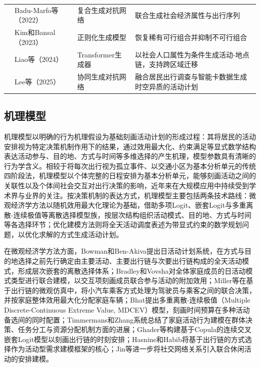 {\begin{longtable}{@{}L{1.9cm}L{3.3cm}L{2.8cm}L{5.4cm}@{}}
 & Badu-Marfo等（2022）\citep{badu-marfoCompositeTravelGenerative2022} & 复合生成对抗网络 & 联合生成社会经济属性与出行序列 \\*
 & Kim和Bansal（2023）\citep{kimDeepGenerativeModel2023} & 正则化生成模型 & 恢复稀有可行组合并抑制不可行组合 \\*
 & Liao等（2024）\citep{liaoDeepActivityModel2024} & Transformer生成器 & 以社会人口属性为条件生成活动-地点链，支持跨区域迁移 \\*
 & Lee等（2025）\citep{leeCollaborativeGenerativeAdversarial2025} & 协同生成对抗网络 & 融合居民出行调查与智能卡数据生成时空异质的活动计划 \\
\end{longtable}
}

\subsection{机理模型}\label{subsec.review.actgen.abm}

机理模型以明确的行为机理假设为基础刻画活动计划的形成过程：其将居民的活动安排视为特定决策机制作用下的结果，通过效用最大化、约束满足等显式数学结构表达活动参与、目的地、方式与时间等多维选择的产生机理，模型参数具有清晰的行为学含义\citep{rasouliActivitybasedModelsTravel2014,castiglioneActivitybasedTravelDemand2015}。相较于将每次出行视为孤立事件、以交通小区为基本分析单元的传统四阶段法，机理模型以个体完整的日程安排为基本分析单元，能够刻画活动之间的关联性以及个体间社会交互对出行决策的影响\citep{castiglioneActivitybasedTravelDemand2015,ericmillerCurrentStateActivitybased2023}，近年来在大规模应用中持续受到学术界与业界的关注\citep{nguyenLargescaleActivitybasedDemand2025,haghighiWeeklongActivitybasedModelling2025}。按决策机制的表达方式，机理模型主要包括两条技术路线：微观经济学方法以随机效用最大化理论为基础，借助多项Logit、嵌套Logit与多重离散-连续极值等离散选择模型族，按层次结构组织活动模式、目的地、方式与时间等各选择环节；优化建模方法则将全天活动调度表述为带显式约束的数学规划问题，以优化求解的方式生成活动计划。

在微观经济学方法方面，Bowman和Ben-Akiva\citep{bowmanActivitybasedDisaggregateTravel2001}提出日活动计划系统，在方式与目的地选择之前先行确定由主要活动、主要出行链与次要出行链构成的全天活动模式，形成层次嵌套的离散选择体系；Bradley和Vovsha\citep{bradleyModelJointChoice2005}对全体家庭成员的日活动模式类型进行联合建模，以交互项刻画成员联合参与活动的附加效用；Miller等\citep{millerTourbasedModelTravel2005}在基于出行链的微观仿真中，将小汽车乘客方式处理为驾驶员与乘客之间的联合决策，并按家庭整体效用最大化分配家庭车辆；Bhat\citep{bhatMultipleDiscretecontinuousExtreme2008}提出多重离散-连续极值（Multiple Discrete-Continuous Extreme Value, MDCEV）模型，刻画时间预算在多种活动备选间的同时配置；Timmermans和Zhang\citep{timmermansModelingHouseholdActivity2009}系统总结了家庭活动行为建模在群体决策、任务分工与资源分配机制方面的进展；Ghader等\citep{ghaderCopulabasedContinuousCrossnested2021}构建基于Copula的连续交叉嵌套Logit模型以刻画出行链的时刻安排；Hasnine和Habib\citep{hasnineTourbasedModeChoice2021}将基于出行链的方式选择作为活动型需求建模框架的核心；Jin等\citep{jinNovelApproachStudy2025}进一步将社交网络关系引入联合休闲活动的安排建模。

